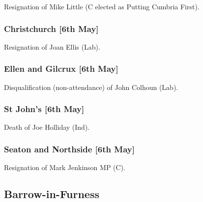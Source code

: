\documentclass[a4paper,openany]{book}
\begin{document}
\begin{resultsiii}

Resignation of Mike Little (C elected as Putting Cumbria First).

\subsubsection*{Christchurch \hspace*{\fill}\nolinebreak[1]%
	\enspace\hspace*{\fill}
	[6th May]}


Resignation of Joan Ellis (Lab).

\subsubsection*{Ellen and Gilcrux \hspace*{\fill}\nolinebreak[1]%
	\enspace\hspace*{\fill}
	[6th May]}


Disqualification (non-attendance) of John Colhoun (Lab).

\subsubsection*{St John's \hspace*{\fill}\nolinebreak[1]%
	\enspace\hspace*{\fill}
	[6th May]}


Death of Joe Holliday (Ind).

\subsubsection*{Seaton and Northside \hspace*{\fill}\nolinebreak[1]%
	\enspace\hspace*{\fill}
	[6th May]}


Resignation of Mark Jenkinson MP (C).

\subsection*{Barrow-in-Furness}


\end{resultsiii}
\end{document}
